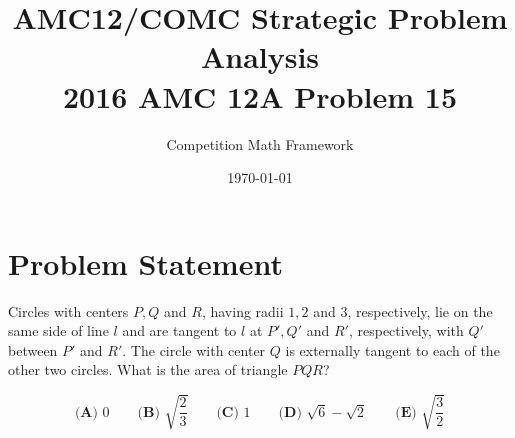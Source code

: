 \documentclass[]{article}
\begin{document}
\title{AMC12/COMC Strategic Problem Analysis\\2016 AMC 12A Problem 15}
\author{Competition Math Framework}
\date{\today}
\maketitle

\section*{Problem Statement}

Circles with centers $P, Q$ and $R$, having radii $1, 2$ and $3$, respectively, lie on the same side of line $l$ and are tangent to $l$ at $P', Q'$ and $R'$, respectively, with $Q'$ between $P'$ and $R'$. The circle with center $Q$ is externally tangent to each of the other two circles. What is the area of triangle $PQR$?

\[\textbf{(A) } 0\qquad \textbf{(B) } \sqrt{\frac{2}{3}}\qquad\textbf{(C) } 1\qquad\textbf{(D) } \sqrt{6}-\sqrt{2}\qquad\textbf{(E) }\sqrt{\frac{3}{2}}\]
\end{document}

